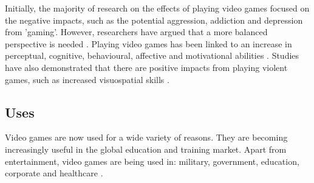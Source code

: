 \documentclass[a4paper,11.5pt]{report}
\numberwithin{figure}{section}
\numberwithin{table}{section}
\numberwithin{equation}{section}
\numberwithin{equation}{section}
\begin{document}
Initially, the majority of research on the effects of playing video games focused on the negative impacts, such as the potential aggression, addiction and depression from 'gaming'. However, researchers have argued that a more balanced perspective is needed \citep{Granic2014}. Playing video games has been linked to an increase in perceptual, cognitive, behavioural, affective and motivational abilities \citep{Connolly2012}. Studies have also demonstrated that there are positive impacts from playing violent games, such as increased visuospatial skills \citep{Ferguson2007}. 

\subsection{Uses}

Video games are now used for a wide variety of reasons. They are becoming increasingly useful in the global education and training market. Apart from entertainment, video games are being used in: military, government, education, corporate and healthcare \citep{Johann2015}.





\end{document}
